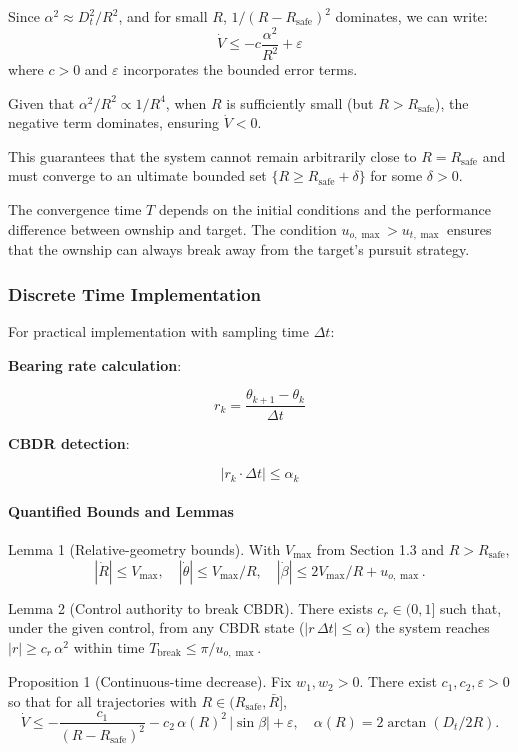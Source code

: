 \documentclass[11pt,a4paper]{article}
\numberwithin{equation}{section}
\begin{document}
Since $\alpha^2 \approx D_t^2/R^2$, and for small $R$, $1/(R-R_{\text{safe}})^2$ dominates, we can write:
\[
\dot{V} \leq -c \frac{\alpha^2}{R^2} + \varepsilon
\]
where $c > 0$ and $\varepsilon$ incorporates the bounded error terms.

Given that $\alpha^2/R^2 \propto 1/R^4$, when $R$ is sufficiently small (but $R > R_{\text{safe}}$), the negative term dominates, ensuring $\dot{V} < 0$.

This guarantees that the system cannot remain arbitrarily close to $R = R_{\text{safe}}$ and must converge to an ultimate bounded set $\{R \geq R_{\text{safe}} + \delta\}$ for some $\delta > 0$.

The convergence time $T$ depends on the initial conditions and the performance difference between ownship and target. The condition $u_{o,\max} > u_{t,\max}$ ensures that the ownship can always break away from the target's pursuit strategy.

\subsubsection{Discrete Time Implementation}

For practical implementation with sampling time $\Delta t$:

\textbf{Bearing rate calculation}:

\[
r_k = \frac{\theta_{k+1} - \theta_k}{\Delta t}
\]

\textbf{CBDR detection}:

\[
|r_k \cdot \Delta t| \leq \alpha_k
\]

\paragraph{Quantified Bounds and Lemmas}

Lemma 1 (Relative-geometry bounds). With $V_{\max}$ from Section 1.3 and $R>R_{\text{safe}}$,
\[
|\dot R|\le V_{\max},\quad |\dot \theta|\le V_{\max}/R,\quad |\dot \beta|\le 2V_{\max}/R+u_{o,\max}.
\]

Lemma 2 (Control authority to break CBDR). There exists $c_r\in(0,1]$ such that, under the given control, from any CBDR state ($|r\,\Delta t|\le \alpha$) the system reaches $|r|\ge c_r\,\alpha^2$ within time $T_{\text{break}}\le \pi/u_{o,\max}$.

Proposition 1 (Continuous-time decrease). Fix $w_1,w_2>0$. There exist $c_1,c_2,\varepsilon>0$ so that for all trajectories with $R\in(R_{\text{safe}},\bar R]$,
\[
\dot V \le -\frac{c_1}{(R-R_{\text{safe}})^2} - c_2\,\alpha(R)^2\,|\sin\beta| + \varepsilon,\quad \alpha(R)=2\arctan(D_t/2R).
\]
\end{document}
